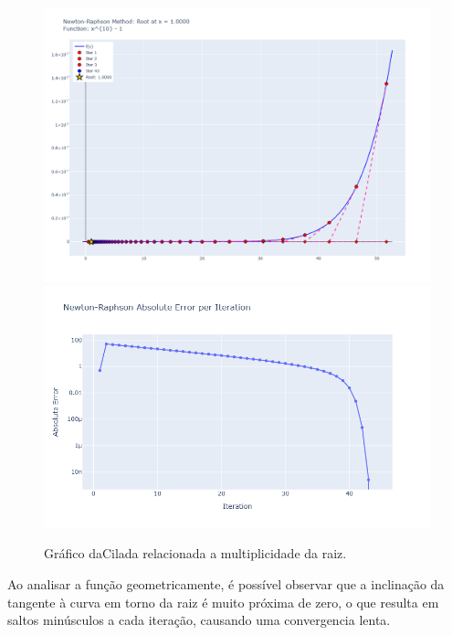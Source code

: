 \begin{figure}[H]
    \centering 
    \includegraphics[width=1\textwidth]{Imagens/pitfalls/01/x_10-1.png}
    \includegraphics[width=1\textwidth]{Imagens/pitfalls/01/err_x_10-1.png}
    \caption{Gráfico daCilada relacionada a multiplicidade da raiz.}
    \label{fig:ciladaMultRaiz}
\end{figure}

Ao analisar a função geometricamente, é possível observar que a inclinação da tangente à curva em torno da raiz é muito próxima de zero, o que resulta em saltos minúsculos a cada iteração, causando uma convergencia lenta.

